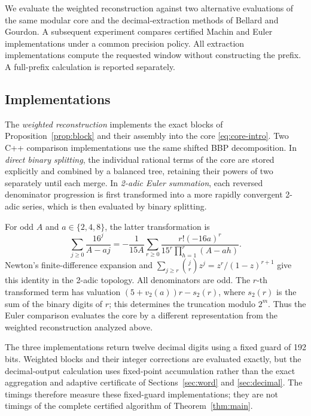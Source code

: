 \documentclass[11pt]{article}
\numberwithin{equation}{section}
\theoremstyle{definition}
\begin{document}
We evaluate the weighted reconstruction against two alternative
evaluations of the same modular core and the decimal-extraction
methods of Bellard and Gourdon. A subsequent experiment compares
certified Machin and Euler implementations under a common precision
policy. All extraction implementations compute the requested window
without constructing the prefix. A full-prefix calculation is
reported separately.

\subsection{Implementations}\label{sec:experimental-methods}

The \emph{weighted reconstruction} implements the exact blocks of
Proposition~\ref{prop:block} and their assembly into the core
\eqref{eq:core-intro}. Two C++ comparison implementations use the same
shifted BBP decomposition. In \emph{direct binary splitting}, the
individual rational terms of the core are stored explicitly and
combined by a balanced tree, retaining their powers of two separately
until each merge. In \emph{2-adic Euler summation}, each reversed
denominator progression is first transformed into a more rapidly
convergent 2-adic series, which is then evaluated by binary splitting.

For odd $A$ and $a\in\{2,4,8\}$, the latter transformation is
\begin{equation}\label{eq:euler-comparison}
 \sum_{j\ge0}\frac{16^j}{A-aj}
 =-\frac{1}{15A}\sum_{r\ge0}
 \frac{r!(-16a)^r}{15^r\prod_{h=1}^{r}(A-ah)}.
\end{equation}
Newton's finite-difference expansion and
$\sum_{j\ge r}\binom jr z^j=z^r/(1-z)^{r+1}$ give this identity
in the 2-adic topology. All denominators are odd. The $r$-th
transformed term has valuation
$(5+v_2(a))r-s_2(r)$, where $s_2(r)$ is the sum of the binary
digits of $r$; this determines the truncation modulo $2^m$.
Thus the Euler comparison evaluates the core by a different
representation from the weighted reconstruction analyzed above.

The three implementations return twelve decimal digits using a
fixed guard of 192 bits. Weighted blocks and their integer corrections
are evaluated exactly, but the decimal-output calculation uses
fixed-point accumulation rather than the exact aggregation and
adaptive certificate of Sections~\ref{sec:word} and \ref{sec:decimal}.
The timings therefore measure these fixed-guard implementations;
they are not timings of the complete certified algorithm of
Theorem~\ref{thm:main}.
\end{document}
